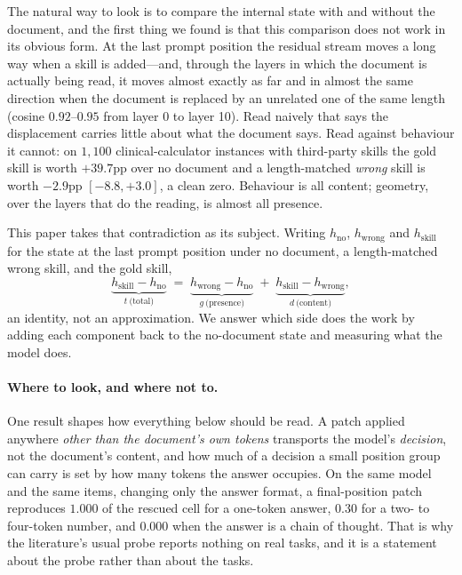 \documentclass{article}
\newcommand{\dvec}{\ensuremath{d}}
\newcommand{\gvec}{\ensuremath{g}}
\newcommand{\tvec}{\ensuremath{t}}
\begin{document}
The natural way to look is to compare the internal state with and without the
document, and the first thing we found is that this comparison does not work in
its obvious form. At the last prompt position the residual stream moves a long
way when a skill is added---and, through the layers in which the document is
actually being read, it moves almost exactly as far and in almost the same
direction when the document is replaced by an unrelated one of the same length
(cosine $0.92$--$0.95$ from layer 0 to layer 10). Read naively that says the
displacement carries little about what the document says. Read against behaviour
it cannot: on $1{,}100$ clinical-calculator instances with third-party skills the
gold skill is worth $+39.7$pp over no document and a length-matched \emph{wrong}
skill is worth $-2.9$pp $[-8.8, +3.0]$, a clean zero. Behaviour is all content;
geometry, over the layers that do the reading, is almost all presence.

This paper takes that contradiction as its subject. Writing $h_{\text{no}}$,
$h_{\text{wrong}}$ and $h_{\text{skill}}$ for the state at the last prompt
position under no document, a length-matched wrong skill, and the gold skill,
\begin{equation}
\underbrace{h_{\text{skill}} - h_{\text{no}}}_{\tvec\ \text{(total)}}
\;=\;
\underbrace{h_{\text{wrong}} - h_{\text{no}}}_{\gvec\ \text{(presence)}}
\;+\;
\underbrace{h_{\text{skill}} - h_{\text{wrong}}}_{\dvec\ \text{(content)}} ,
\end{equation}
an identity, not an approximation. We answer which side does the work by adding
each component back to the no-document state and measuring what the model does.

\paragraph{Where to look, and where not to.} One result shapes how everything
below should be read. A patch applied anywhere \emph{other than the document's
own tokens} transports the model's \emph{decision}, not the document's content,
and how much of a decision a small position group can carry is set by how many
tokens the answer occupies. On the same model and the same items, changing only
the answer format, a final-position patch reproduces $1.000$ of the rescued cell
for a one-token answer, $0.30$ for a two- to four-token number, and $0.000$ when
the answer is a chain of thought. That is why the literature's usual probe
reports nothing on real tasks, and it is a statement about the probe rather than
about the tasks.
\end{document}
